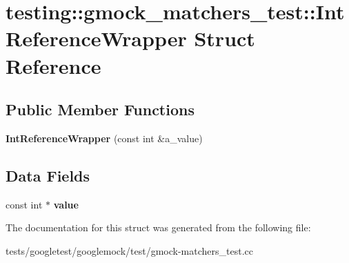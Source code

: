 \hypertarget{structtesting_1_1gmock__matchers__test_1_1IntReferenceWrapper}{}\section{testing\+:\+:gmock\+\_\+matchers\+\_\+test\+:\+:Int\+Reference\+Wrapper Struct Reference}
\label{structtesting_1_1gmock__matchers__test_1_1IntReferenceWrapper}
\subsection*{Public Member Functions}
\begin{DoxyCompactItemize}
\item 
\mbox{\label{structtesting_1_1gmock__matchers__test_1_1IntReferenceWrapper_a9094df655096520977e13d620fbf7be7}} 
{\bfseries Int\+Reference\+Wrapper} (const int \&a\+\_\+value)
\end{DoxyCompactItemize}
\subsection*{Data Fields}
\begin{DoxyCompactItemize}
\item 
\mbox{\label{structtesting_1_1gmock__matchers__test_1_1IntReferenceWrapper_ac8fcb05733aa1fdb6c5236731b236cf6}} 
const int $\ast$ {\bfseries value}
\end{DoxyCompactItemize}


The documentation for this struct was generated from the following file\+:\begin{DoxyCompactItemize}
\item 
tests/googletest/googlemock/test/gmock-\/matchers\+\_\+test.\+cc\end{DoxyCompactItemize}

